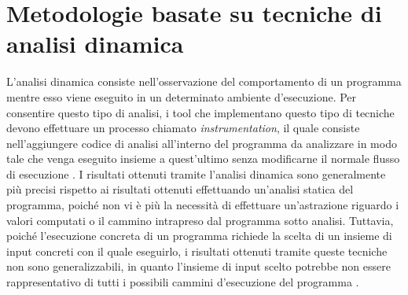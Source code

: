 \documentclass[../main.tex]{subfiles}
\begin{document}
\section{Metodologie basate su tecniche di analisi dinamica}
L'analisi dinamica consiste nell'osservazione del comportamento di un programma mentre esso viene eseguito in un determinato ambiente d'esecuzione.
Per consentire questo tipo di analisi, i tool che implementano questo tipo di tecniche devono effettuare un processo chiamato \textit{instrumentation}, il quale
consiste nell'aggiungere codice di analisi all'interno del programma da analizzare in modo tale che venga eseguito insieme a quest'ultimo senza modificarne il normale
flusso di esecuzione \cite{DBA_DBI}. I risultati ottenuti tramite l'analisi dinamica sono generalmente più precisi rispetto ai risultati ottenuti effettuando un'analisi statica
del programma, poiché non vi è più la necessità di effettuare un'astrazione riguardo i valori computati o il cammino intrapreso dal programma sotto analisi.
Tuttavia, poiché l'esecuzione concreta di un programma richiede la scelta di un insieme di input concreti con il quale eseguirlo, i risultati ottenuti tramite queste tecniche non sono
generalizzabili, in quanto l'insieme di input scelto potrebbe non essere rappresentativo di tutti i possibili cammini d'esecuzione del programma \cite{Synergy_Duality}.
\end{document}
